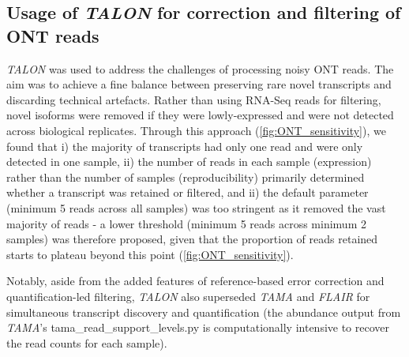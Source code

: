 \subsection{Usage of \textit{TALON} for correction and filtering of ONT reads}
\textit{TALON} was used to address the challenges of processing noisy ONT reads. The aim was to achieve a fine balance between preserving rare novel transcripts and discarding technical artefacts. Rather than using RNA-Seq reads for filtering, novel isoforms were removed if they were lowly-expressed and were not detected across biological replicates. Through this approach (\cref{fig:ONT_sensitivity}), we found that i) the majority of transcripts had only one read and were only detected in one sample, ii) the number of reads in each sample (expression) rather than the number of samples (reproducibility) primarily determined whether a transcript was retained or filtered, and ii) the default parameter (minimum 5 reads across all samples) was too stringent as it removed the vast majority of reads - a lower threshold (minimum 5 reads across minimum 2 samples) was therefore proposed, given that the proportion of reads retained starts to plateau beyond this point (\cref{fig:ONT_sensitivity}).  

Notably, aside from the added features of reference-based error correction and quantification-led filtering, \textit{TALON} also superseded \textit{TAMA} and \textit{FLAIR} for simultaneous transcript discovery and quantification (the abundance output from \textit{TAMA}'s tama\_read\_support\_levels.py is computationally intensive to recover the read counts for each sample). 
\resumetocwriting